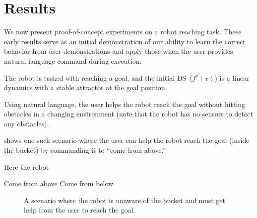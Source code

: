 \section{Results}
\label{sec:results}

We now present proof-of-concept experiments on a robot reaching task.
These early results serve as an initial demonstration of our ability to learn the correct behavior from user demonstrations and apply those when the user provides natural language command during execution.

The robot is tasked with reaching a goal, and the initial DS~($f^o(x)$) is a linear dynamics with a stable attractor at the goal position.

Using natural language, the user helps the robot reach the goal without hitting obstacles in a changing environment (note that the robot has no sensors to detect any obstacles).

 shows one such scenario where the user can help the robot reach the goal (inside the bucket) by commanding it to ``come from above.''

Here the robot




Come from above
Come from below


\begin{figure}[t]
  \centering
  \caption{
    A scenario where the robot is unaware of the bucket and must get help from the user to reach the goal.
  }
  \label{figBucket}
\end{figure}
